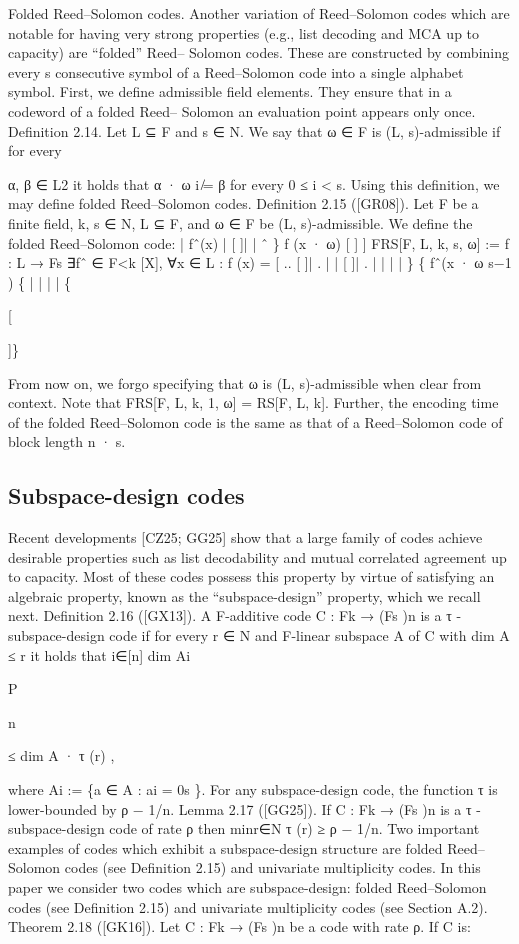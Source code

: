 \documentclass[11pt]{article}
\begin{document}
Folded Reed–Solomon codes. Another variation of Reed–Solomon codes which are notable
for having very strong properties (e.g., list decoding and MCA up to capacity) are “folded” Reed–
Solomon codes. These are constructed by combining every s consecutive symbol of a Reed–Solomon
code into a single alphabet symbol.
First, we define admissible field elements. They ensure that in a codeword of a folded Reed–
Solomon an evaluation point appears only once.
Definition
2.14. Let L ⊆ F and s ∈ N. We say that ω ∈ F is (L, s)-admissible if for every

α, β ∈ L2 it holds that α · ω i ̸= β for every 0 ≤ i < s.
Using this definition, we may define folded Reed–Solomon codes.
Definition 2.15 ([GR08]). Let F be a finite field, k, s ∈ N, L ⊆ F, and ω ∈ F be (L, s)-admissible.
We define the folded Reed–Solomon code:
|
fˆ(x)
|
[
]|
|
ˆ
\}
f
(x
·
ω)
[
]
]
FRS[F, L, k, s, ω] := f : L → Fs ∃fˆ ∈ F<k [X], ∀x ∈ L : f (x) = [
..
[
]| .
|
|
[
]|
.
|
|
|
|
\}
\{
fˆ(x · ω s−1 )
\{
|
|
|
|
\{

[

]\}

From now on, we forgo specifying that ω is (L, s)-admissible when clear from context. Note
that FRS[F, L, k, 1, ω] = RS[F, L, k]. Further, the encoding time of the folded Reed–Solomon code
is the same as that of a Reed–Solomon code of block length n · s.


\subsection{Subspace-design codes}



Recent developments [CZ25; GG25] show that a large family of codes achieve desirable properties
such as list decodability and mutual correlated agreement up to capacity. Most of these codes
possess this property by virtue of satisfying an algebraic property, known as the “subspace-design”
property, which we recall next.
Definition 2.16 ([GX13]). A F-additive code C : Fk → (Fs )n is a τ -subspace-design code if for
every r ∈ N and F-linear subspace A of C with dim A ≤ r it holds that
i∈[n] dim Ai

P

n

≤ dim A · τ (r) ,

where Ai := \{a ∈ A : ai = 0s \}.
For any subspace-design code, the function τ is lower-bounded by ρ − 1/n.
Lemma 2.17 ([GG25]). If C : Fk → (Fs )n is a τ -subspace-design code of rate ρ then minr∈N τ (r) ≥
ρ − 1/n.
Two important examples of codes which exhibit a subspace-design structure are folded Reed–
Solomon codes (see Definition 2.15) and univariate multiplicity codes. In this paper we consider two
codes which are subspace-design: folded Reed–Solomon codes (see Definition 2.15) and univariate
multiplicity codes (see Section A.2).
Theorem 2.18 ([GK16]). Let C : Fk → (Fs )n be a code with rate ρ. If C is:
\end{document}
